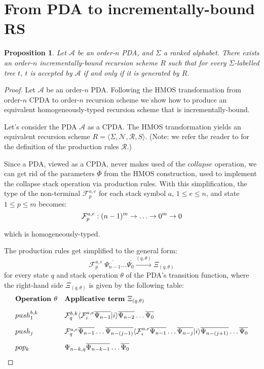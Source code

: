 \documentclass[a4paper]{article}[12pt]
\newtheorem{proposition}{Proposition}[section]
\theoremstyle{remark}
\theoremstyle{definition}
\begin{document}
\section{From PDA to incrementally-bound RS}
\label{sec:PDAtoIncrementallyBoundRS}
\begin{proposition}
	Let $\mathcal{A}$ be an order-$n$ PDA, and $\Sigma$ a ranked alphabet. There exists an order-$n$ incrementally-bound recursion scheme $R$
	such that for every $\Sigma$-labelled tree $t$, $t$ is accepted by $\mathcal{A}$ if and only if it is generated by $R$.
\end{proposition}
\begin{proof}
Let $\mathcal{A}$ be an order-$n$ PDA. Following the HMOS transformation from order-$n$ CPDA to order-$n$ recursion scheme \cite{hmos-lics08} we show how to produce an equivalent homogeneously-typed recursion scheme that is incrementally-bound.

Let's consider the PDA $\mathcal{A}$ as a CPDA. The HMOS transformation yields an equivalent recursion scheme
$R = \langle \Sigma, \mathcal{N}, \mathcal{R}, S \rangle$.
(Note: we refer the reader to \cite{hmos-lics08} for the definition of the production rules
$\mathcal{R}$.)

Since a PDA, viewed as a CPDA, never makes used of the $collapse$ operation, we can get rid of the parameters $\overline\Phi$ from the
HMOS construction, used to implement the collapse stack operation via production rules.
With this simplification, the type of the non-terminal $\mathcal{F}_p^{a,e}$  for each stack symbol $a$, $1\leq e \leq n$, and state $1\leq p \leq m$  becomes:
 $$ \mathcal{F}_p^{a,e} : (n-1)^m \rightarrow \ldots \rightarrow 0^m \rightarrow 0$$

which is homogeneously-typed.

The production rules get simplified to the general form:
 $$ \mathcal{F}_p^{a,e} \  \overline{\Psi_{n-1}} \ldots \overline{\Psi_0} \stackrel{(q,\theta)}\rightarrow \Xi_{(q,\theta)}$$
for every state $q$ and stack operation $\theta$ of the PDA's transition function,
where the right-hand side $\Xi_{(q,\theta)}$ is given by the following table:
$$\begin{array}{ll}
\mbox{\bf Operation $\theta$} & \mbox{\bf Applicative term } \Xi_{(q,\theta)} \\[10pt]
push_1^{b,k} & \mathcal{F}_q^{b,k} \langle \mathcal{F}_i^{a,e} \overline{\Psi_{n-1}} | i \rangle \overline{\Psi_{n-2}} \ldots
 \overline{\Psi_0} \\[10pt]
push_j & \mathcal{F}_q^{a,e} \overline{\Psi_{n-1}} \ldots \overline{\Psi_{n-(j-1)}}\langle \mathcal{F}_i^{a,e} \overline{\Psi_{n-1}} \ldots \overline{\Psi_{n-j}} | i \rangle \overline{\Psi_{n-(j+1)}} \ldots
 \overline{\Psi_0} \\[10pt]
pop_k & \Psi_{n-k,q} \overline{\Psi_{n-k-1}} \ldots \overline{\Psi_{0}}
 \end{array}
 $$


\end{proof}
\end{document}
